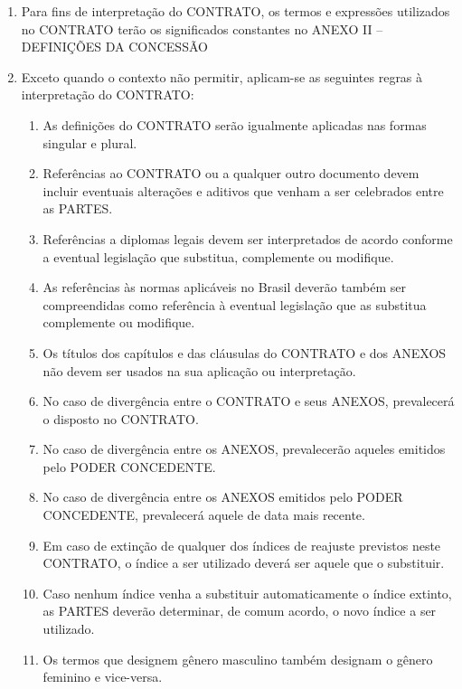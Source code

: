 \documentclass[a4paper,11pt]{report} %
\begin{document}
\begin{enumerate}
\item \label{itm:93HA} Para fins de interpretação do CONTRATO, os termos e expressões utilizados no CONTRATO terão os significados constantes no ANEXO II – DEFINIÇÕES DA CONCESSÃO

\item \label{itm:P5EM} Exceto quando o contexto não permitir, aplicam-se as seguintes regras à interpretação do CONTRATO:

\begin{enumerate}[label*=\arabic*.]
\item \label{itm:6Z7C} As definições do CONTRATO serão igualmente aplicadas nas formas singular e plural.
\item \label{itm:MML8} Referências ao CONTRATO ou a qualquer outro documento devem incluir eventuais alterações e aditivos que venham a ser celebrados entre as PARTES.
\item \label{itm:KD3C} Referências a diplomas legais devem ser interpretados de acordo conforme a eventual legislação que substitua, complemente ou modifique. 
\item \label{itm:AZGZ} As referências às normas aplicáveis no Brasil deverão também ser compreendidas como referência à eventual legislação que as substitua complemente ou modifique.
\item \label{itm:5U2M} Os títulos dos capítulos e das cláusulas do CONTRATO e dos ANEXOS não devem ser usados na sua aplicação ou interpretação.
\item \label{itm:EQ7R} No caso de divergência entre o CONTRATO e seus ANEXOS, prevalecerá o disposto no CONTRATO.
\item \label{itm:BDN5} No caso de divergência entre os ANEXOS, prevalecerão aqueles emitidos pelo PODER CONCEDENTE.
\item \label{itm:SFUZ} No caso de divergência entre os ANEXOS emitidos pelo PODER CONCEDENTE, prevalecerá aquele de data mais recente. 
\item \label{itm:6Y8N} Em caso de extinção de qualquer dos índices de reajuste previstos neste CONTRATO, o índice a ser utilizado deverá ser aquele que o substituir.
\item \label{itm:FPAR} Caso nenhum índice venha a substituir automaticamente o índice extinto, as PARTES deverão determinar, de comum acordo, o novo índice a ser utilizado.
\item \label{itm:ES2L} Os termos que designem gênero masculino também designam o gênero feminino e vice-versa.
\end{enumerate}

\end{enumerate}
\end{document}
